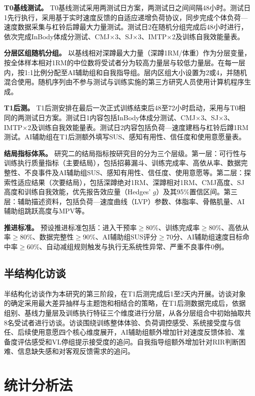 \textbf{T0基线测试。} T0基线测试采用两测试日方案，两测试日之间间隔48小时。测试日1先行执行，采用基于实时速度反馈的自适应递增负荷协议，同步完成个体负荷—速度数据采集与杠铃后蹲最大力量测试。测试日2在随机分组完成后48小时进行，依次完成InBody体成分测试、CMJ$\times$3、SJ$\times$3、IMTP$\times$2及训练自我效能量表。

\textbf{分层区组随机分组。} 以基线相对深蹲最大力量（深蹲1RM/体重）作为分层变量，按全体样本相对1RM的中位数将受试者分为较高力量层与较低力量层。在每一层内，按1:1比例分配至AI辅助组和自我指导组。层内区组大小设置为2或4，并随机混合使用。随机序列由不参与测试与训练实施的第三方研究人员使用计算机程序生成。

\textbf{T1后测。} T1后测安排在最后一次正式训练结束后48至72小时启动，采用与T0相同的两测试日方案。测试日1内容包括InBody体成分测试、CMJ$\times$3、SJ$\times$3、IMTP$\times$2及训练自我效能量表。测试日2内容包括负荷—速度建档与杠铃后蹲1RM测试。AI辅助组在T1后测额外填写SUS、感知有用性、信任度和使用意愿量表。

\textbf{结局指标体系。} 研究二的结局指标按研究目的分为三个层级。第一层：可行性与训练执行质量指标（主要结局），包括招募漏斗、训练完成率、高依从率、数据完整性、不良事件及AI辅助组SUS、感知有用性、信任度、使用意愿等。第二层：探索性适应结果（次要结局），包括深蹲绝对1RM、深蹲相对1RM、CMJ高度、SJ高度和训练自我效能，优先报告效应量（Hedges' $g$）及其95\%置信区间。第三层：辅助描述资料，包括负荷—速度曲线（LVP）参数、体脂率、骨骼肌量、AI辅助组跳跃高度与MPV等。

\textbf{推进标准。} 预设推进标准包括：进入干预率$\geq$80\%、训练完成率$\geq$80\%、高依从率$\geq$80\%、数据完整性$\geq$90\%、AI辅助组SUS评分$\geq$70分、AI辅助组速度目标命中率$\geq$60\%、自动减组规则触发与执行无系统性异常、严重不良事件0例。

\subsection{半结构化访谈}

半结构化访谈作为本研究的第三阶段，在T1后测完成后1至2天内开展。访谈对象的确定采用最大差异抽样与主题饱和相结合的策略，在T1后测数据完成后，依据组别、基线力量层及训练执行特征三个维度进行分层，从各分层组合中初始抽取共8名受试者进行访谈。访谈围绕训练整体体验、负荷调控感受、系统接受度与信任、后续使用意愿四个核心维度展开，AI辅助组额外增加针对速度反馈体验、准备度评估感受和VL停组提示接受度的追问。自我指导组额外增加针对RIR判断困难、信息缺失感和对客观反馈需求的追问。

\section{统计分析法}

